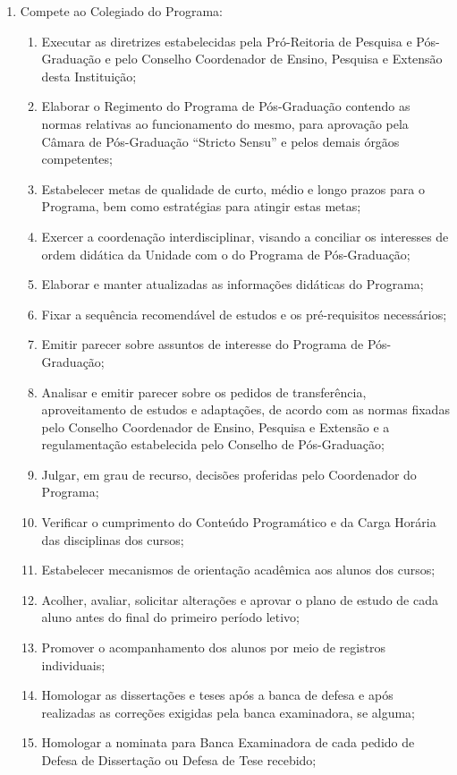 \documentclass{article}
\begin{document}
\begin{enumerate}
	\item Compete ao Colegiado do Programa:
	\begin{enumerate}[label=\Roman*]
		\item Executar as diretrizes estabelecidas pela Pró-Reitoria de Pesquisa e Pós-Graduação e pelo Conselho Coordenador de Ensino, Pesquisa e Extensão desta Instituição;
		\item Elaborar o Regimento do Programa de Pós-Graduação contendo as normas relativas ao funcionamento do mesmo, para aprovação pela Câmara de Pós-Graduação ``Stricto Sensu'' e pelos demais órgãos competentes;		
		\item Estabelecer metas de qualidade de curto, médio e longo prazos para o Programa, bem como estratégias para atingir estas metas;
		\item Exercer a coordenação interdisciplinar, visando a conciliar os interesses de ordem didática da Unidade com o do Programa de Pós-Graduação;
		\item Elaborar e manter atualizadas as informações didáticas do Programa;
		\item Fixar a sequência recomendável de estudos e os pré-requisitos necessários;
		\item Emitir parecer sobre assuntos de interesse do Programa de Pós-Graduação;
		\item Analisar e emitir parecer sobre os pedidos de transferência, aproveitamento de estudos e adaptações, de acordo com as normas fixadas pelo Conselho Coordenador de Ensino, Pesquisa e Extensão e a regulamentação estabelecida pelo Conselho de Pós-Graduação;
		\item Julgar, em grau de recurso, decisões proferidas pelo Coordenador do Programa;
		\item Verificar o cumprimento do Conteúdo Programático e da Carga Horária das disciplinas dos cursos; %
		\item Estabelecer mecanismos de orientação acadêmica aos alunos dos cursos;
		\item Acolher, avaliar, solicitar alterações e aprovar o plano de estudo de cada aluno antes do final do primeiro período letivo; 
		\item Promover o acompanhamento dos alunos por meio de registros individuais;
		\item Homologar as dissertações e teses após a banca de defesa e após realizadas as correções exigidas pela banca examinadora, se alguma;
		\item Homologar a nominata para Banca Examinadora de cada pedido de Defesa de Dissertação ou Defesa de Tese recebido;

\end{enumerate}
\end{enumerate}
\end{document}
